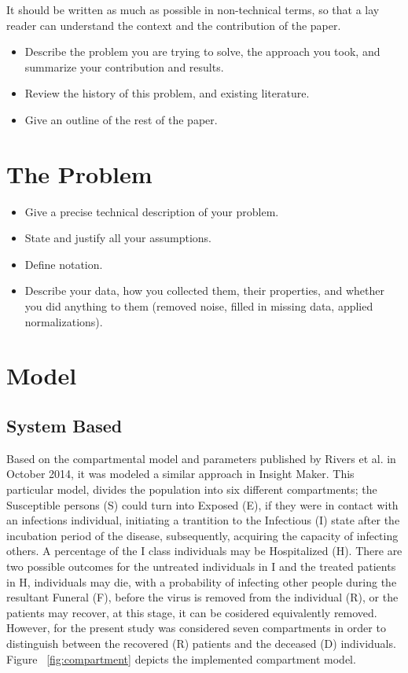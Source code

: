 \documentclass[10pt]{article}
\begin{document}
It should be written as much as possible in non-technical terms, so that a
lay reader can understand the context and the contribution of the paper.

\begin{itemize}
\item Describe the problem you are trying to solve, the approach
you took, and summarize your contribution and results.

\item Review the history of this problem, and existing literature.

\item Give an outline of the rest of the paper.
\end{itemize}

\section{The Problem}
\begin{itemize}
\item Give a precise technical description of your problem. 

\item State and justify all your assumptions. 

\item Define notation. 

\item Describe your data, how you collected them, their properties,
and whether you did 
anything to them (removed noise, filled in missing data, 
applied normalizations).
\end{itemize}
%
%
%
%
%
%
%
%
%

\section{Model}\label{sec:Model}
%
%
\subsection{System Based}
Based on the compartmental model and parameters published by Rivers et al.\cite{Rivers2014} in October 2014, it was modeled a similar approach in Insight Maker.  This particular model, divides the population into six different compartments; the Susceptible persons (S) could turn into Exposed (E), if they were in contact with an infections individual, initiating a trantition to the Infectious (I) state after the incubation period of the disease, subsequently, acquiring the capacity of infecting others. A percentage of the I class individuals may be Hospitalized (H). There are two possible outcomes for the untreated individuals in I and the treated patients in H, individuals may die, with a probability of infecting other people during the resultant Funeral (F), before the virus is removed from the individual (R), or the patients may recover, at this stage, it can be cosidered equivalently removed. However, for the present study was considered seven compartments in order to distinguish between the recovered (R) patients and the deceased (D) individuals. Figure ~\ref{fig:compartment} depicts the implemented compartment model. \\
\end{document}
